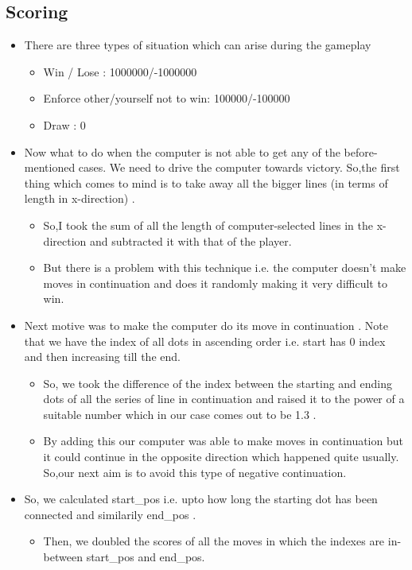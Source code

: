 \documentclass[11pt]{article}
\begin{document}
\subsection{Scoring}
\begin{itemize}
\item There are three types of situation which can arise during the gameplay
\begin{itemize}
    \item Win / Lose : 1000000/-1000000
\item Enforce other/yourself not to win: 100000/-100000
\item Draw : 0
\end{itemize}
\item Now what to do when the computer is not able to get any of the before-mentioned cases.
We need to drive the computer towards victory.
So,the first thing which comes to mind is to take away all the bigger lines (in terms of length in x-direction) .
\begin{itemize}
 \item So,I took the sum of all the length of computer-selected lines in the x-direction and subtracted it with that of the player.
\item But there is a problem with  this technique i.e. the computer doesn't make moves in continuation and does it randomly making it very difficult to win.
\end{itemize}
\item Next motive was to make the computer do its move in continuation .
Note that we have the index of all dots in ascending order i.e. start has 0 index and then increasing till the end.
\begin{itemize}
\item So, we took the difference of the index between the starting and ending dots of all the series of line in continuation and raised it to the power of a suitable number which in our case comes out to be 1.3 .
\item By adding this our computer was able to make moves in continuation but it could continue in the opposite direction which happened quite usually.
So,our next aim is to avoid this type of negative continuation.
\end{itemize}
\item So, we calculated start\_pos i.e. upto how long the starting dot has been connected and similarily end\_pos .
\begin{itemize}
\item Then, we doubled the scores of all the moves in which the indexes are in-between start\_pos and end\_pos.

\end{itemize}
\end{itemize}
\end{document}
